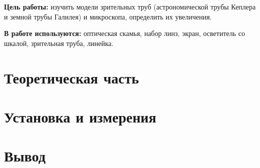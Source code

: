\documentclass{letask}
\begin{document}


\textbf{Цель работы:} изучить модели зрительных труб (астрономической трубы Кеплера и земной трубы Галилея) и микроскопа, определить их увеличения.

\textbf{В работе используются:} оптическая скамья, набор линз, экран, осветитель со шкалой, зрительная труба, линейка.

\section{Теоретическая часть}

\section{Установка и измерения}

\section{Вывод}
\end{document}

